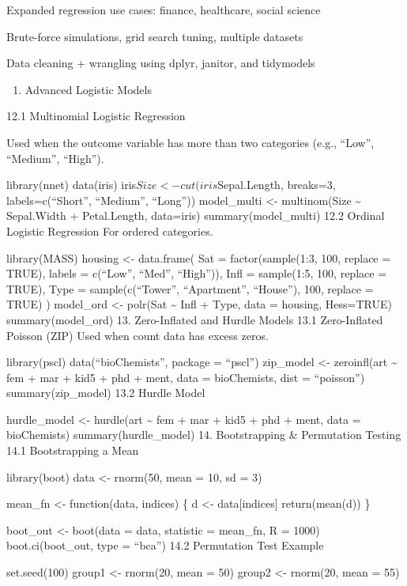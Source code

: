 \documentclass[
  letterpaper,
  DIV=11,
  numbers=noendperiod]{scrreprt}
\providecommand{\tightlist}{%
  \setlength{\itemsep}{0pt}\setlength{\parskip}{0pt}}
\begin{document}
Expanded regression use cases: finance, healthcare, social science

Brute-force simulations, grid search tuning, multiple datasets

Data cleaning + wrangling using dplyr, janitor, and tidymodels

\begin{enumerate}
\def\labelenumi{\arabic{enumi}.}
\setcounter{enumi}{11}
\tightlist
\item
  Advanced Logistic Models
\end{enumerate}

12.1 Multinomial Logistic Regression

Used when the outcome variable has more than two categories (e.g.,
``Low'', ``Medium'', ``High'').

library(nnet) data(iris) iris\(Size <- cut(iris\)Sepal.Length, breaks=3,
labels=c(``Short'', ``Medium'', ``Long'')) model\_multi \textless-
multinom(Size \textasciitilde{} Sepal.Width + Petal.Length, data=iris)
summary(model\_multi) 12.2 Ordinal Logistic Regression For ordered
categories.

library(MASS) housing \textless- data.frame( Sat = factor(sample(1:3,
100, replace = TRUE), labels = c(``Low'', ``Med'', ``High'')), Infl =
sample(1:5, 100, replace = TRUE), Type = sample(c(``Tower'',
``Apartment'', ``House''), 100, replace = TRUE) ) model\_ord \textless-
polr(Sat \textasciitilde{} Infl + Type, data = housing, Hess=TRUE)
summary(model\_ord) 13. Zero-Inflated and Hurdle Models 13.1
Zero-Inflated Poisson (ZIP) Used when count data has excess zeros.

library(pscl) data(``bioChemists'', package = ``pscl'') zip\_model
\textless- zeroinfl(art \textasciitilde{} fem + mar + kid5 + phd + ment,
data = bioChemists, dist = ``poisson'') summary(zip\_model) 13.2 Hurdle
Model

hurdle\_model \textless- hurdle(art \textasciitilde{} fem + mar + kid5 +
phd + ment, data = bioChemists) summary(hurdle\_model) 14. Bootstrapping
\& Permutation Testing 14.1 Bootstrapping a Mean

library(boot) data \textless- rnorm(50, mean = 10, sd = 3)

mean\_fn \textless- function(data, indices) \{ d \textless-
data{[}indices{]} return(mean(d)) \}

boot\_out \textless- boot(data = data, statistic = mean\_fn, R = 1000)
boot.ci(boot\_out, type = ``bca'') 14.2 Permutation Test Example

set.seed(100) group1 \textless- rnorm(20, mean = 50) group2 \textless-
rnorm(20, mean = 55)
\end{document}
